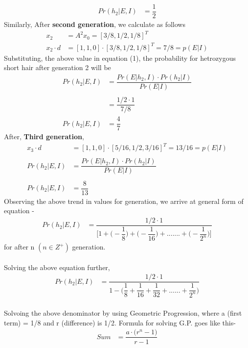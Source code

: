 \documentclass{article}
\begin{document}
\begin{itemize}
\begin{align*}
    Pr(h_2|E,I) &= \dfrac{1}{2}
    \end{align*}	
    Similarly, After \textbf{second generation}, we calculate as follows
    \begin{align*}
    x_2 &= A^2x_0 = [3/8, 1/2, 1/8]^T\\
    x_2 \cdot d &=  [1, 1, 0]\cdot[3/8, 1/2, 1/8]^T = 7/8 = p(E|I) 
    \end{align*}
    Substituting, the above value in equation (1), the probability for hetrozygous short hair after generation 2 will be
    \begin{align*}
    Pr(h_2|E,I) &= \dfrac{Pr(E|h_2,I)\cdot Pr(h_2|I)}{Pr(E|I)}\\\\
    &= \dfrac{1/2 \cdot 1}{7/8}\\
    Pr(h_2|E,I) &= \dfrac{4}{7}
    \end{align*}
    After, \textbf{Third generation},
    \begin{align*}
    x_3 \cdot d &=  [1, 1, 0]\cdot[5/16, 1/2, 3/16]^T = 13/16 = p(E|I)\\\\
    Pr(h_2|E,I) &= \dfrac{Pr(E|h_2,I)\cdot Pr(h_2|I)}{Pr(E|I)}\\\\
    Pr(h_2|E,I) &= \dfrac{8}{13}
    \end{align*}
    Observing the above trend in values for generation, we arrive at general form of equation -
    \begin{align*}
    Pr(h_2|E,I) &= \dfrac{1/2 \cdot 1}{\Big[1 + \Big(-\dfrac{1}{8}\Big) + \Big(-\dfrac{1}{16}\Big) +.......+ \Big(-\dfrac{1}{2^{n}}\Big)\Big]}
    \end{align*}
    for after n $ (n\in Z^+) $ generation.\\\\
    Solving the above equation further,\\ 
    \begin{align*}
    Pr(h_2|E,I) &= \dfrac{1/2 \cdot 1}{1 - \Big(\dfrac{1}{8} + \dfrac{1}{16} + \dfrac{1}{32} +......+ \dfrac{1}{2^{n}}\Big)}
    \end{align*}\\
    Solvoing the above denominator by using Geometric Progression, where a (first term) = 1/8 and r (difference) is 1/2. Formula for solving G.P. goes like this-
    \begin{align*}
    Sum &= \dfrac{a\cdot\Big(r^n - 1\Big)}{r - 1}\\\\

\end{align*}
\end{itemize}
\end{document}
